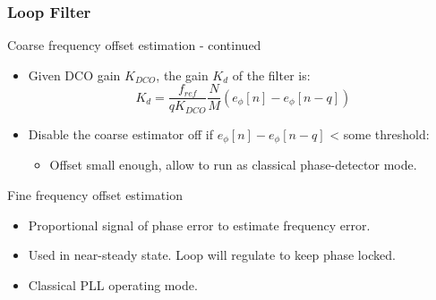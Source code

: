 \documentclass[t, screen, aspectratio=43]{beamer}
\begin{document}
\begin{frame}
	\frametitle{Loop Filter}
	\begin{block}{Coarse frequency offset estimation - continued}
		\begin{itemize}
			\footnotesize
			\item Given DCO gain $K_{DCO}$, the gain $K_d$ of the filter is:
			\tiny
			\vspace{-0.5em}
			\begin{equation}
				K_{d} = \frac{f_{ref}}{qK_{DCO}}\frac{N}{M}\left( e_\phi[n]-e_\phi[n-q]\right )
			\end{equation}				
			\footnotesize	
			\item Disable the coarse estimator off if $e_\phi[n]-e_\phi[n-q]$ < some threshold:
			\begin{itemize}
				\scriptsize
				\item Offset small enough, allow to run as classical phase-detector mode.
			\end{itemize}	
		\end{itemize} 
	\end{block}
	\begin{block}{Fine frequency offset estimation}
		\begin{itemize}
			\footnotesize
			\item Proportional signal of phase error to estimate frequency error.
			\item Used in near-steady state. Loop will regulate to keep phase locked.
			\item Classical PLL operating mode.
		\end{itemize} 	
	\end{block}
\end{frame}


\end{document}
